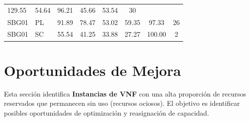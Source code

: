 \documentclass[11pt,a4paper]{article}
\begin{document}
\begin{table}[H]
\begin{tabular}{llcccccc}
    
        129.55
     &

    
        54.64
     &

    
        96.21
     &

    
        45.66
     &

    
        53.54
     &

    
        30
    
    \\

    SBG01 &
    PL &

    
        91.89
     &

    
        78.47
     &

    
        53.02
     &

    
        59.35
     &

    
        97.33
     &

    
        26
    
    \\

    SBG01 &
    SC &

    
        55.54
     &

    
        41.25
     &

    
        33.88
     &

    
        27.27
     &

    
        100.00
     &

    
        2
    
    \\


\bottomrule
\end{tabular}
\end{table}



\section{Oportunidades de Mejora}

Esta sección identifica \textbf{Instancias de VNF} con una alta proporción de recursos reservados que permanecen sin uso (recursos ociosos). El objetivo es identificar posibles oportunidades de optimización y reasignación de capacidad.
\end{document}

